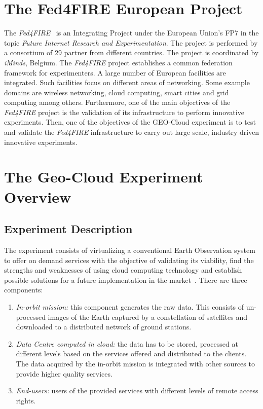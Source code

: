 \section{The Fed4FIRE European Project}%
The \emph{Fed4FIRE}~\cite{Fed4FIRE2014a} is an Integrating Project under the European Union's
\ac{FP7} in the topic \emph{Future
  Internet Research and Experimentation}. The project is performed by a
consortium of 29 partner from different countries. The project is coordinated by
 \emph{iMinds}, Belgium.
The \emph{Fed4FIRE} project establishes a common federation framework for
experimenters. A large  number of European facilities are integrated. Such facilities focus on different  areas
of networking. Some example domains are wireless networking, cloud computing, smart
cities and grid computing among others.
Furthermore, one of the main objectives of the \emph{Fed4FIRE} project is the
validation of its infrastructure to perform
innovative experiments. Then, one of the objectives of the GEO-Cloud experiment
is to test and validate the \emph{Fed4FIRE} infrastructure to carry out large
scale, industry driven innovative experiments.

\section{The Geo-Cloud Experiment Overview}


\subsection{Experiment Description}

The experiment consists of virtualizing a conventional Earth Observation system to offer on
demand services with the objective of validating its viability, find
the strengths and weaknesses of using cloud computing technology and establish
possible solutions for a future implementation in the market~\cite{Becedas2014}. There are three
components:
\begin{enumerate}
\item \emph{In-orbit mission:} this component generates the raw data. This
  consists of un-processed images of the Earth captured by a constellation of
  satellites and downloaded to a distributed network of ground stations.
\item \emph{Data Centre computed in cloud:} the data has to be stored, processed at different levels based on the services offered and distributed to the clients. The data acquired by the in-orbit mission is integrated with other sources to provide higher quality services.
\item \emph{End-users:} users of the provided services with different levels of remote access rights.

\end{enumerate}


